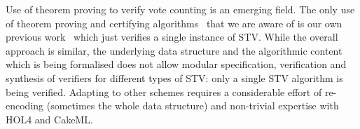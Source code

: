 \documentclass[10pt,conference]{IEEEtran}
\begin{document}


Use of theorem proving to verify vote counting 
is an emerging field. The only use of theorem proving and certifying algorithms~\cite{CertAlg} that we are aware of is our own previous work~\cite{GhaleVSTTE} which just verifies a single instance of STV. While the overall approach is similar, the underlying data structure and the algorithmic content which is being formalised does not allow modular specification, verification and synthesis of verifiers for different types of STV: only a single STV algorithm is
being verified.  Adapting to other schemes
requires a considerable effort of re-encoding (sometimes the whole data structure) and non-trivial expertise with HOL4 and CakeML. 
\end{document}
